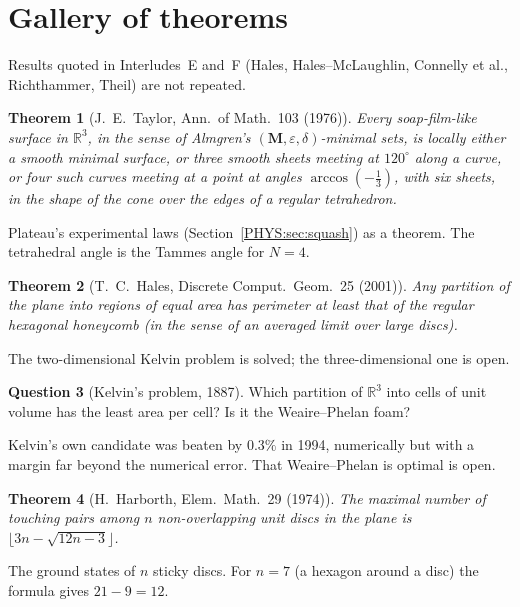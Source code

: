 \documentclass[11pt,openany]{book}
\theoremstyle{plain}
\newtheorem{theorem}{Theorem}[chapter]
\theoremstyle{definition}
\newtheorem{question}[theorem]{Question}
\theoremstyle{remark}
\newcommand{\R}{\mathbb{R}}
\begin{document}
\section{Gallery of theorems}
\label{PHYS:sec:gallery}

Results quoted in Interludes~E and~F (Hales, Hales--McLaughlin, Connelly et al., Richthammer, Theil) are not
repeated.

\begin{theorem}[J.~E.~Taylor, Ann.\ of Math.\ 103 (1976)]\label{PHYS:thm:taylor}
Every soap-film-like surface in $\R^3$, in the sense of Almgren's $(\mathbf M,\varepsilon,\delta)$-minimal sets, is
locally either a smooth minimal surface, or three smooth sheets meeting at $120^\circ$ along a curve, or
four such curves meeting at a point at angles $\arccos(-\frac13)$, with six sheets, in the shape of the cone over
the edges of a regular tetrahedron.
\end{theorem}
\noindent Plateau's experimental laws (Section~\ref{PHYS:sec:squash}) as a theorem. The tetrahedral angle is the
Tammes angle for $N=4$.

\begin{theorem}[T.~C.~Hales, Discrete Comput.\ Geom.\ 25 (2001)]\label{PHYS:thm:honeycomb}
Any partition of the plane into regions of equal area has perimeter at least that of the regular hexagonal
honeycomb (in the sense of an averaged limit over large discs).
\end{theorem}
\noindent The two-dimensional Kelvin problem is solved; the three-dimensional one is open.

\begin{question}[Kelvin's problem, 1887]
Which partition of $\R^3$ into cells of unit volume has the least area per cell? Is it the Weaire--Phelan
foam?
\end{question}
\noindent Kelvin's own candidate was beaten by $0.3\%$ in 1994, numerically but with a margin far beyond the
numerical error. That Weaire--Phelan is optimal is open.

\begin{theorem}[H.~Harborth, Elem.\ Math.\ 29 (1974)]\label{PHYS:thm:harborth}
The maximal number of touching pairs among $n$ non-overlapping unit discs in the plane is
$\lfloor3n-\sqrt{12n-3}\rfloor$.
\end{theorem}
\noindent The ground states of $n$ sticky discs. For $n=7$ (a hexagon around a disc) the formula gives
$21-9=12$.
\end{document}
